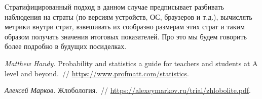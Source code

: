 \documentclass[12pt, a4paper, oneside]{article}
\begin{document}
Стратифицированный подход в данном случае предписывает разбивать наблюдения на страты (по версиям устройств, ОС, браузеров и т.д.), вычислять метрики внутри страт, взвешивать их сообразно размерам этих страт и таким образом получать значения итоговых показателей. Про это мы будем говорить более подробно в будущих посиделках. 


\begin{thebibliography}{1}
	\emph{Matthew Handy.}
	Probability and statistics a guide for teachers and students at A level and beyond.~//
	\url{https://www.profmatt.com/statistics}.
	
	\emph{Алексей Марков.}
	Жлобология.~//
	\url{https://alexeymarkov.ru/trial/zhlobolite.pdf}.
\end{thebibliography}
\end{document}
